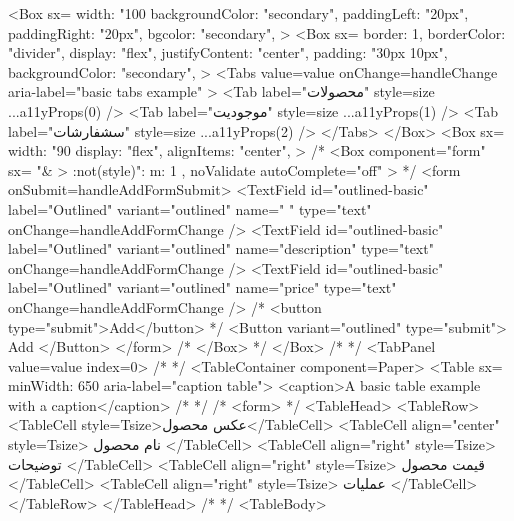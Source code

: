  <Box
   sx={{
     width: "100%
     backgroundColor: "secondary",
     paddingLeft: "20px",
     paddingRight: "20px",
     bgcolor: "secondary",
   }}
 >
   <Box
     sx={{
       border: 1,
       borderColor: "divider",
       display: "flex",
       justifyContent: "center",
       padding: "30px 10px",
       backgroundColor: "secondary",
     }}
   >
     <Tabs
       value={value}
       onChange={handleChange}
       aria-label="basic tabs example"
     >
       <Tab label="محصولات" style={size} {...a11yProps(0)} />
       <Tab label="موجودیت" style={size} {...a11yProps(1)} />
       <Tab label="سشفارشات" style={size} {...a11yProps(2)} />
     </Tabs>
   </Box>
   <Box
     sx={{
       width: "90%
       display: "flex",
       alignItems: "center",
     }}
   >
     {/* <Box
       component="form"
       sx={{
         "& > :not(style)": { m: 1 },
       }}
       noValidate
       autoComplete="off"
     > */}
     <form onSubmit={handleAddFormSubmit}>
       <TextField
         id="outlined-basic"
         label="Outlined"
         variant="outlined"
         name="  "
         type="text"
         onChange={handleAddFormChange}
       />
       <TextField
         id="outlined-basic"
         label="Outlined"
         variant="outlined"
         name="description"
         type="text"
         onChange={handleAddFormChange}
       />
       <TextField
         id="outlined-basic"
         label="Outlined"
         variant="outlined"
         name="price"
         type="text"
         onChange={handleAddFormChange}
       />
       {/* <button type="submit">Add</button> */}
       <Button variant="outlined" type="submit">
         Add
       </Button>
     </form>
     {/* </Box> */}
   </Box>
   {/*  */}
   <TabPanel value={value} index={0}>
     {/*  */}
     <TableContainer component={Paper}>
       <Table sx={{ minWidth: 650 }} aria-label="caption table">
         <caption>A basic table example with a caption</caption>
         {/*  */}
         {/* <form> */}
         <TableHead>
           <TableRow>
             <TableCell style={Tsize}>عکس محصول</TableCell>
             <TableCell align="center" style={Tsize}>
               نام محصول
             </TableCell>
             <TableCell align="right" style={Tsize}>
               توضیحات
             </TableCell>
             <TableCell align="right" style={Tsize}>
               قیمت محصول
             </TableCell>
             <TableCell align="right" style={Tsize}>
               عملیات
             </TableCell>
           </TableRow>
         </TableHead>
         {/*  */}
         <TableBody>
